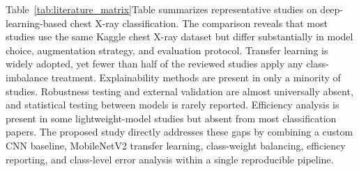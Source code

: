 \documentclass[preprint,12pt]{elsarticle}
\begin{document}
Table~\ref{tab:literature_matrix}Table summarizes representative studies on deep-learning-based chest X-ray
classification.
The comparison reveals that most studies use the same Kaggle
chest X-ray dataset but differ substantially in model choice,
augmentation strategy, and evaluation protocol.
Transfer learning is widely adopted, yet fewer than half of the
reviewed studies apply any class-imbalance treatment.
Explainability methods are present in only a minority of studies.
Robustness testing and external validation are almost universally
absent, and statistical testing between models is rarely reported.
Efficiency analysis is present in some lightweight-model studies but
absent from most classification papers.
The proposed study directly addresses these gaps by combining a custom
CNN baseline, MobileNetV2 transfer learning, class-weight balancing,
efficiency reporting, and class-level error analysis within a single
reproducible pipeline.
\end{document}
